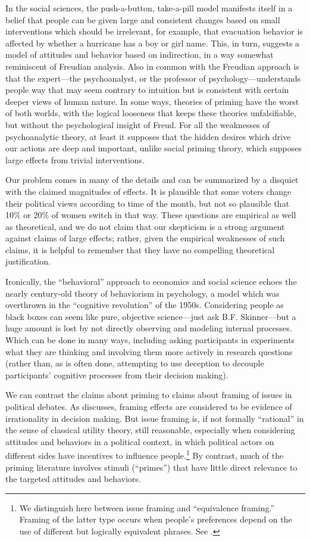 \documentclass[11pt,letterpaper]{article}
\begin{document}
In the social sciences, the push-a-button, take-a-pill model manifests itself in
a belief that people can be given large and consistent changes based on small
interventions which should be irrelevant, for example, that evacuation behavior
is affected by whether a hurricane has a boy or girl name. This, in turn,
suggests a model of attitudes and behavior based on indirection, in a way
somewhat reminiscent of Freudian analysis. Also in common with the Freudian
approach is that the expert---the psychoanalyst, or the professor of
psychology---understands people way that may seem contrary to intuition but is
consistent with certain deeper views of human nature. In some ways, theories of
priming have the worst of both worlds, with the logical looseness that keeps
these theories unfalsifiable, but without the psychological insight of Freud.
For all the weaknesses of psychoanalytic theory, at least it supposes that the
hidden desires which drive our actions are deep and important, unlike social
priming theory, which supposes large effects from trivial interventions.

Our problem comes in many of the details and can be summarized by a disquiet
with the claimed magnitudes of effects. It is plausible that some voters change
their political views according to time of the month, but not so plausible that
10\% or 20\% of women switch in that way. These questions are empirical as well
as theoretical, and we do not claim that our skepticism is a strong argument
against claims of large effects; rather, given the empirical weaknesses of such
claims, it is helpful to remember that they have no compelling theoretical
justification.

Ironically, the ``behavioral'' approach to economics and social science echoes
the nearly century-old theory of behaviorism in psychology, a model which was
overthrown in the ``cognitive revolution'' of the 1950s. Considering people as
black boxes can seem like pure, objective science---just ask B.F. Skinner---but
a huge amount is lost by not directly observing and modeling internal processes.
Which can be done in many ways, including asking participants in experiments
what they are thinking and involving them more actively in research questions
(rather than, as is often done, attempting to use deception to decouple
participants' cognitive processes from their decision making).

We can contrast the claims about priming to claims about framing of issues in
political debates. As \citet{druckman2004} discusses, framing effects are
considered to be evidence of irrationality in decision making. But issue framing
is, if not formally ``rational'' in the sense of classical utility theory, still
reasonable, especially when considering attitudes and behaviors in a political
context, in which political actors on different sides have incentives to
influence people.\footnote{We distinguish here between issue framing and
``equivalence framing.'' Framing of the latter type occurs when people's
preferences depend on the use of different but logically equivalent phrases.
See \citet[pp.~114,]{chong2007}.} By contrast, much of the priming literature
involves stimuli (``primes'') that have little direct relevance to the targeted
attitudes and behaviors.
\end{document}

